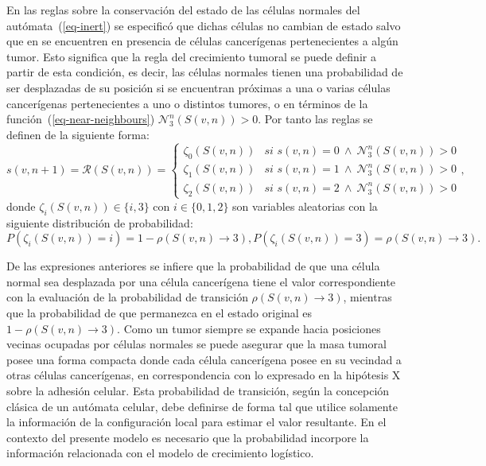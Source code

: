 En las reglas sobre la conservaci\'on del estado de las c\'elulas normales del aut\'omata~(\ref{eq-inert}) se especific\'o que dichas c\'elulas no cambian de estado salvo que en se encuentren en presencia de c\'elulas cancer\'igenas pertenecientes a alg\'un tumor. Esto significa que la regla del crecimiento tumoral se puede definir a partir de esta condici\'on, es decir, las c\'elulas normales tienen una probabilidad de ser desplazadas de su posici\'on si se encuentran pr\'oximas a una o varias c\'elulas cancer\'igenas pertenecientes a uno o distintos tumores, o en t\'erminos de la funci\'on~(\ref{eq-near-neighbours}) $\mathcal{N}_3^n(S(v,n)) > 0$. Por tanto las reglas se definen de la siguiente forma:
\begin{equation}
s(v,n+1)=\mathcal{R}(S(v,n))=\left\lbrace
	\begin{array}{ll}
		\zeta_0(S(v,n))& \textit{si } s(v,n)=0~\wedge~\mathcal{N}_3^n(S(v,n)) > 0 \\
		\zeta_1(S(v,n))& \textit{si } s(v,n)=1~\wedge~\mathcal{N}_3^n(S(v,n)) > 0 \\
		\zeta_2(S(v,n))& \textit{si } s(v,n)=2~\wedge~\mathcal{N}_3^n(S(v,n)) > 0 
	\end{array}
\right., \label{eq-celldiv}
\end{equation}
donde $\zeta_i(S(v,n)) \in \lbrace i,3 \rbrace$ con $i \in \lbrace 0,1,2 \rbrace$ son variables aleatorias con la siguiente distribuci\'on de probabilidad:
\begin{subequations}
\begin{equation}
P(\zeta_i(S(v,n))=i) = 1 - \rho(S(v,n) \rightarrow 3),
\end{equation}
\begin{equation}
P(\zeta_i(S(v,n))=3) = \rho(S(v,n) \rightarrow 3).
\end{equation}
\end{subequations}

De las expresiones anteriores se infiere que la probabilidad de que una c\'elula normal sea desplazada por una c\'elula cancer\'igena tiene el valor correspondiente con la evaluaci\'on de la probabilidad de transici\'on $\rho(S(v,n) \rightarrow 3)$, mientras que la probabilidad de que permanezca en el estado original es $1-\rho(S(v,n) \rightarrow 3)$. Como un tumor siempre se expande hacia posiciones vecinas ocupadas por c\'elulas normales se puede asegurar que la masa tumoral posee una forma compacta donde cada c\'elula cancer\'igena posee en su vecindad a otras c\'elulas cancer\'igenas, en correspondencia con lo expresado en la hip\'otesis X sobre la adhesi\'on celular. Esta probabilidad de transici\'on, seg\'un la concepci\'on cl\'asica de un aut\'omata celular, debe definirse de forma tal que utilice solamente la informaci\'on de la configuraci\'on local para estimar el valor resultante. En el contexto del presente modelo es necesario que la probabilidad incorpore la informaci\'on relacionada con el modelo de crecimiento log\'istico.

